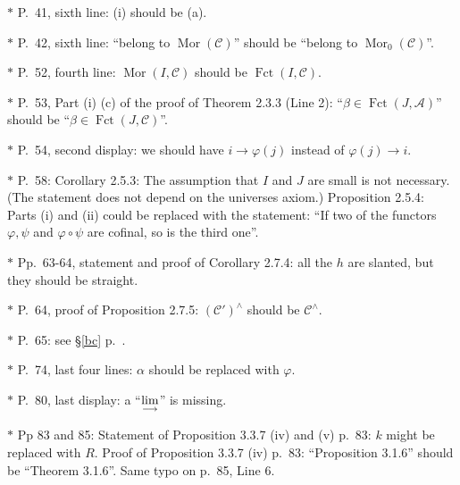 \documentclass[12pt]{article}
\theoremstyle{remark}
\theoremstyle{definition}
\newcommand{\oo}{\operatorname}
\newcommand{\A}{\mathcal A}
\newcommand{\C}{\mathcal C}
\newcommand{\colim}{\operatornamewithlimits{\underset{\longrightarrow}{lim}}}
\DeclareMathOperator{\Hom}{Hom}%
\DeclareMathOperator{\Mor}{Mor}
\DeclareMathOperator{\op}{op}
\begin{document}
\noindent $*$ P.~41, sixth line: (i) should be (a).

\noindent $*$ P.~42, sixth line: ``belong to $\Mor(\C)$'' should be ``belong to $\Mor_0(\C)$''.

\noindent $*$ P.~52, fourth line: $\Mor(I,\C)$ should be $\oo{Fct}(I,\C)$.

\noindent $*$ P.~53, Part (i) (c) of the proof of Theorem 2.3.3 (Line 2): ``$\beta\in\oo{Fct}(J,\A)$'' should be ``$\beta\in\oo{Fct}(J,\C)$''.

\noindent $*$ P.~54, second display: we should have $i\to\varphi(j)$ instead of $\varphi(j)\to i$.



\noindent $*$ P.~58: Corollary 2.5.3: The assumption that $I$ and $J$ are small is not necessary. (The statement does not depend on the universes axiom.) Proposition 2.5.4: Parts (i) and (ii) could be replaced with the statement: ``If two of the functors $\varphi,\psi$ and $\varphi\circ\psi$ are cofinal, so is the third one''.

\noindent $*$ Pp.~63-64, statement and proof of Corollary 2.7.4: all the $h$ are slanted, but they should be straight.

\noindent $*$ P.~64, proof of Proposition 2.7.5: $(\C')^\wedge$ should be $\C^\wedge$.

\noindent $*$ P.~65: see \S\ref{bc} p.~\pageref{bc}.

\noindent $*$ P.~74, last four lines: $\alpha$ should be replaced with $\varphi$.

\noindent $*$ P.~80, last display: a ``$\displaystyle\colim$'' is missing.

\noindent $*$ Pp 83 and 85: Statement of Proposition 3.3.7 (iv) and (v) p.~83: $k$ might be replaced with $R$. %
Proof of Proposition 3.3.7 (iv) p.~83: ``Proposition 3.1.6'' should be ``Theorem 3.1.6''. Same typo on p.~85, Line 6.
\end{document}
